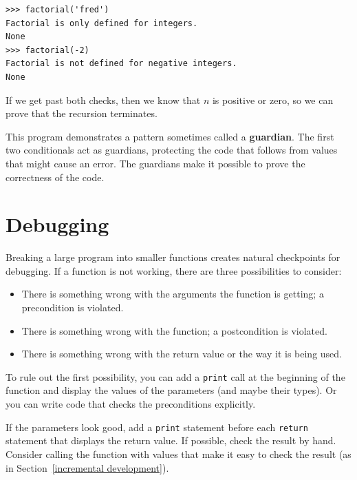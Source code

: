 \documentclass[10pt]{book}
\begin{document}
\beforeverb
\begin{verbatim}
>>> factorial('fred')
Factorial is only defined for integers.
None
>>> factorial(-2)
Factorial is not defined for negative integers.
None
\end{verbatim}
\afterverb
% 
If we get past both checks, then we know that $n$ is positive or
zero, so we can prove that the recursion terminates.


This program demonstrates a pattern sometimes called a {\bf guardian}.
The first two conditionals act as guardians, protecting the code that
follows from values that might cause an error.  The guardians make it
possible to prove the correctness of the code.


\section{Debugging}
\label{factdebug}


Breaking a large program into smaller functions creates natural
checkpoints for debugging.  If a function is not working, there are
three possibilities to consider:

\begin{itemize}

\item There is something wrong with the arguments the function
is getting; a precondition is violated.

\item There is something wrong with the function; a postcondition
is violated.

\item There is something wrong with the return value or the
way it is being used.

\end{itemize}

To rule out the first possibility, you can add a {\tt print} call
at the beginning of the function and display the values of the
parameters (and maybe their types).  Or you can write code
that checks the preconditions explicitly.


If the parameters look good, add a {\tt print} statement before each
{\tt return} statement that displays the return value.  If
possible, check the result by hand.  Consider calling the
function with values that make it easy to check the result
(as in Section~\ref{incremental development}).
\end{document}
